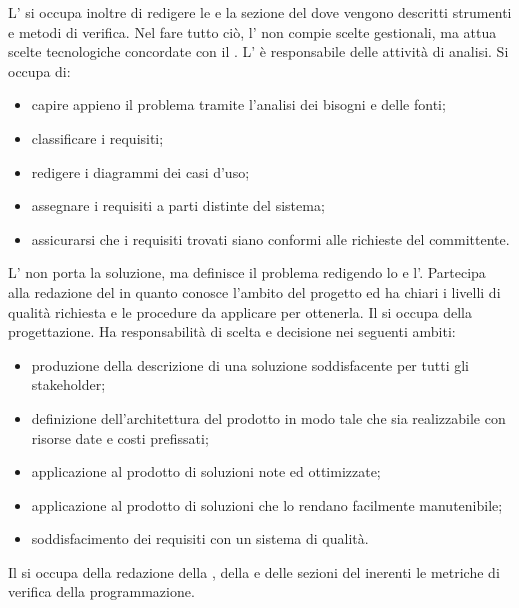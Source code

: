 				L' si occupa inoltre di redigere le  e la sezione del  dove vengono descritti strumenti e metodi di verifica. Nel fare tutto ciò, l' non compie scelte gestionali, ma attua scelte tecnologiche concordate con il .
				L' è responsabile delle attività di analisi. Si occupa di:
				\begin{itemize}
					\item capire appieno il problema tramite l'analisi dei bisogni e delle fonti;
					\item classificare i requisiti;
					\item redigere i diagrammi dei casi d'uso;
					\item assegnare i requisiti a parti distinte del sistema;
					\item assicurarsi che i requisiti trovati siano conformi alle richieste del committente.
				\end{itemize}
				L' non porta la soluzione, ma definisce il problema redigendo lo  e l'. Partecipa alla redazione del  in quanto conosce l’ambito del progetto ed ha chiari i livelli di qualità richiesta e le procedure da applicare per ottenerla.
				Il  si occupa della progettazione. Ha responsabilità di scelta e decisione nei seguenti ambiti:
				\begin{itemize}
					\item produzione della descrizione di una soluzione soddisfacente per tutti gli stakeholder;
					\item definizione dell'architettura del prodotto in modo tale che sia realizzabile con risorse date e costi prefissati;
					\item applicazione al prodotto di soluzioni note ed ottimizzate;
					\item applicazione al prodotto di soluzioni che lo rendano facilmente manutenibile;
					\item soddisfacimento dei requisiti con un sistema di qualità.
				\end{itemize}
				Il  si occupa della redazione della , della  e delle sezioni del  inerenti le metriche di verifica della programmazione.

